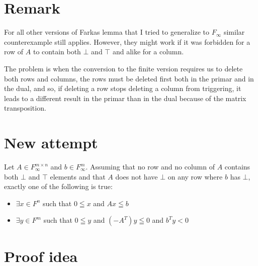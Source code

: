 \documentclass[]{article}
\begin{document}
\section{Remark}

For all other versions of Farkas lemma
that I tried to generalize to $F_\infty$
similar counterexample still applies.
However, they might work if it was forbidden
for a row of $A$ to contain both $\bot$ and $\top$
and alike for a column.

The problem is when the conversion to the finite
version requires us to delete both rows and columns,
the rows must be deleted first both in the primar
and in the dual, and so, if deleting a row stops
deleting a column from triggering, it leads to a
different result in the primar than in the dual
because of the matrix transposition.

\newpage
\section{New attempt}

Let $A \in F_\infty^{m \times n}$ and $b \in F_\infty^m$.
Assuming that no row and no column of $A$ contains
both $\bot$ and $\top$ elements and that
$A$ does not have $\bot$ on any row where $b$ has $\bot$,
exactly one of the following is true:
\begin{itemize}
	\item $\exists x \in F^n$ such that
	$0 \leqq x$ and $A x \leqq b$
	\item $\exists y \in F^m$ such that
	$0 \leqq y$ and $(-A^T) y \leqq 0$ and $b^T y < 0$
\end{itemize}

\section{Proof idea}
\end{document}
